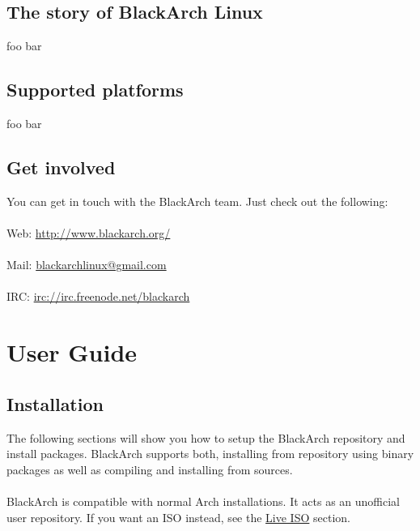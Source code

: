 \documentclass[a4paper, twoside, 11pt]{article}
\begin{document}
\subsection{The story of BlackArch Linux}
foo bar

\subsection{Supported platforms}
foo bar

\subsection{Get involved}
You can get in touch with the BlackArch team. Just check out the following:
\\\\
Web: \url{http://www.blackarch.org/}
\\\\
Mail: \href{mailto:blackarchlinux@gmail.com}{blackarchlinux@gmail.com}
\\\\
IRC: \url{irc://irc.freenode.net/blackarch}


\section{User Guide}

\subsection{Installation}
The following sections will show you how to setup the BlackArch repository and
install packages. BlackArch supports both, installing from repository using
binary packages as well as compiling and installing from sources.
\\\\
BlackArch is compatible with normal Arch installations. It acts as an unofficial
user repository. If you want an ISO instead, see the
\href{http://www.blackarch.org/download.html#iso}{Live ISO} section.
\\\\
\end{document}
